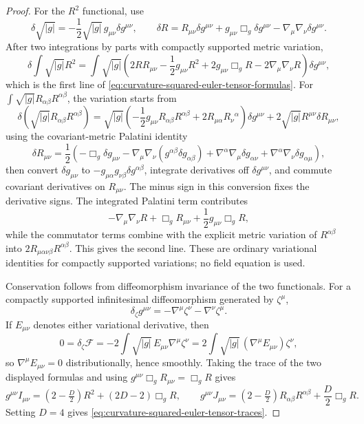 \begin{proof}
For the \(R^2\) functional, use
\begin{equation}
  \delta\sqrt{|g|}
  =
  -\frac12\sqrt{|g|}\,g_{\mu\nu}\delta g^{\mu\nu},
  \qquad
  \delta R
  =
  R_{\mu\nu}\delta g^{\mu\nu}
  +g_{\mu\nu}\Box_g\delta g^{\mu\nu}
  -\nabla_\mu\nabla_\nu\delta g^{\mu\nu}.
  \label{eq:variation-scalar-curvature-inverse-metric}
\end{equation}
After two integrations by parts with compactly supported metric variation,
\[
  \delta\int\sqrt{|g|}R^2
  =
  \int\sqrt{|g|}
  \left(
    2RR_{\mu\nu}
    -\frac12g_{\mu\nu}R^2
    +2g_{\mu\nu}\Box_gR
    -2\nabla_\mu\nabla_\nu R
  \right)\delta g^{\mu\nu},
\]
which is the first line of
\eqref{eq:curvature-squared-euler-tensor-formulas}.  For
\(\int\sqrt{|g|}R_{\alpha\beta}R^{\alpha\beta}\), the variation starts from
\[
  \delta\!\left(\sqrt{|g|}R_{\alpha\beta}R^{\alpha\beta}\right)
  =
  \sqrt{|g|}
  \left(
    -\frac12 g_{\mu\nu}R_{\alpha\beta}R^{\alpha\beta}
    +2R_{\mu\alpha}R_\nu{}^\alpha
  \right)\delta g^{\mu\nu}
  +2\sqrt{|g|}R^{\mu\nu}\delta R_{\mu\nu},
\]
using the covariant-metric Palatini identity
\begin{equation}
  \delta R_{\mu\nu}
  =
  \frac12\left(
    -\Box_g\delta g_{\mu\nu}
    -\nabla_\mu\nabla_\nu(g^{\alpha\beta}\delta g_{\alpha\beta})
    +\nabla^\alpha\nabla_\mu\delta g_{\alpha\nu}
    +\nabla^\alpha\nabla_\nu\delta g_{\alpha\mu}
  \right),
  \label{eq:variation-ricci-covariant-metric}
\end{equation}
then convert \(\delta g_{\mu\nu}\) to
\(-g_{\mu\alpha}g_{\nu\beta}\delta g^{\alpha\beta}\), integrate derivatives
off \(\delta g^{\mu\nu}\), and commute covariant derivatives on
\(R_{\mu\nu}\).  The minus sign in this conversion fixes the derivative
signs.  The integrated Palatini term contributes
\[
  -\nabla_\mu\nabla_\nu R+\Box_gR_{\mu\nu}
  +\frac12g_{\mu\nu}\Box_gR ,
\]
while the commutator terms combine with the explicit metric variation of
\(R^{\alpha\beta}\) into
\(2R_{\mu\alpha\nu\beta}R^{\alpha\beta}\).  This gives the second line.
These are ordinary variational identities for compactly supported variations;
no field equation is used.

Conservation follows from diffeomorphism invariance of the two functionals.
For a compactly supported infinitesimal diffeomorphism generated by
\(\zeta^\mu\),
\[
  \delta_\zeta g^{\mu\nu}
  =
  -\nabla^\mu\zeta^\nu-\nabla^\nu\zeta^\mu .
\]
If \(E_{\mu\nu}\) denotes either variational derivative, then
\[
  0=\delta_\zeta\mathcal F
  =
  -2\int\sqrt{|g|}\,E_{\mu\nu}\nabla^\mu\zeta^\nu
  =
  2\int\sqrt{|g|}\,(\nabla^\mu E_{\mu\nu})\zeta^\nu ,
\]
so \(\nabla^\mu E_{\mu\nu}=0\) distributionally, hence smoothly.  Taking
the trace of the two displayed formulas and using
\(g^{\mu\nu}\Box_gR_{\mu\nu}=\Box_gR\) gives
\[
  g^{\mu\nu}I_{\mu\nu}
  =
  (2-\tfrac D2)R^2+(2D-2)\Box_gR,
  \qquad
  g^{\mu\nu}J_{\mu\nu}
  =
  (2-\tfrac D2)R_{\alpha\beta}R^{\alpha\beta}
  +\frac D2\Box_gR .
\]
Setting \(D=4\) gives
\eqref{eq:curvature-squared-euler-tensor-traces}.
\end{proof}

